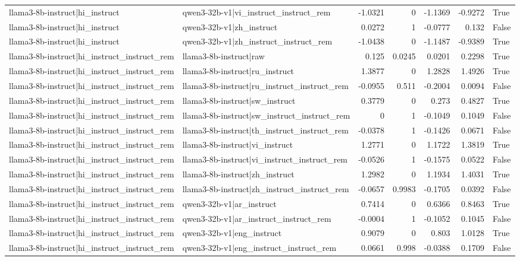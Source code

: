 \begin{table}
\begin{tabular}{l l r r r r l}
llama3-8b-instruct|hi_instruct & qwen3-32b-v1|vi_instruct_instruct_rem & -1.0321 & 0 & -1.1369 & -0.9272 & True \\
llama3-8b-instruct|hi_instruct & qwen3-32b-v1|zh_instruct & 0.0272 & 1 & -0.0777 & 0.132 & False \\
llama3-8b-instruct|hi_instruct & qwen3-32b-v1|zh_instruct_instruct_rem & -1.0438 & 0 & -1.1487 & -0.9389 & True \\
llama3-8b-instruct|hi_instruct_instruct_rem & llama3-8b-instruct|raw & 0.125 & 0.0245 & 0.0201 & 0.2298 & True \\
llama3-8b-instruct|hi_instruct_instruct_rem & llama3-8b-instruct|ru_instruct & 1.3877 & 0 & 1.2828 & 1.4926 & True \\
llama3-8b-instruct|hi_instruct_instruct_rem & llama3-8b-instruct|ru_instruct_instruct_rem & -0.0955 & 0.511 & -0.2004 & 0.0094 & False \\
llama3-8b-instruct|hi_instruct_instruct_rem & llama3-8b-instruct|sw_instruct & 0.3779 & 0 & 0.273 & 0.4827 & True \\
llama3-8b-instruct|hi_instruct_instruct_rem & llama3-8b-instruct|sw_instruct_instruct_rem & 0 & 1 & -0.1049 & 0.1049 & False \\
llama3-8b-instruct|hi_instruct_instruct_rem & llama3-8b-instruct|th_instruct_instruct_rem & -0.0378 & 1 & -0.1426 & 0.0671 & False \\
llama3-8b-instruct|hi_instruct_instruct_rem & llama3-8b-instruct|vi_instruct & 1.2771 & 0 & 1.1722 & 1.3819 & True \\
llama3-8b-instruct|hi_instruct_instruct_rem & llama3-8b-instruct|vi_instruct_instruct_rem & -0.0526 & 1 & -0.1575 & 0.0522 & False \\
llama3-8b-instruct|hi_instruct_instruct_rem & llama3-8b-instruct|zh_instruct & 1.2982 & 0 & 1.1934 & 1.4031 & True \\
llama3-8b-instruct|hi_instruct_instruct_rem & llama3-8b-instruct|zh_instruct_instruct_rem & -0.0657 & 0.9983 & -0.1705 & 0.0392 & False \\
llama3-8b-instruct|hi_instruct_instruct_rem & qwen3-32b-v1|ar_instruct & 0.7414 & 0 & 0.6366 & 0.8463 & True \\
llama3-8b-instruct|hi_instruct_instruct_rem & qwen3-32b-v1|ar_instruct_instruct_rem & -0.0004 & 1 & -0.1052 & 0.1045 & False \\
llama3-8b-instruct|hi_instruct_instruct_rem & qwen3-32b-v1|eng_instruct & 0.9079 & 0 & 0.803 & 1.0128 & True \\
llama3-8b-instruct|hi_instruct_instruct_rem & qwen3-32b-v1|eng_instruct_instruct_rem & 0.0661 & 0.998 & -0.0388 & 0.1709 & False \\

\end{tabular}
\end{table}
